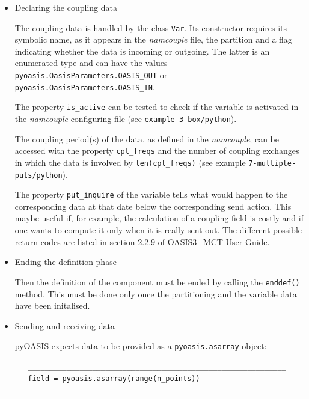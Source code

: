 \begin{itemize}
To initialise  a grid and write the grid longitudes and latitudes, one
has to create an instance of the {\tt Grid} class. Then to write the grid cell corner longitudes and latitudes, areas, mask, cell valid fraction, angle, the
{\tt set\_corners}, {\tt set\_area},  {\tt set\_mask},  {\tt set\_frac}, and {\tt set\_angle} methods can be used respectively.

\item{Declaring the coupling data}
\label{{index:declaring-the-coupling-data}}

The coupling data is handled by the class {\tt Var}. Its constructor requires
its symbolic name, as it appears in the {\it namcouple} file, the partition and a flag indicating whether the
data is incoming or outgoing. The latter is an enumerated type and can
have the values {\tt pyoasis.OasisParameters.OASIS\_OUT} or
{\tt pyoasis.OasisParameters.OASIS\_IN}. 

The property {\tt is\_active} can be tested to check if the variable is
activated in the {\it namcouple} configuring file (see {\tt example 3-box/python}).

The coupling period(s) of the data, as defined in the {\it namcouple}, can be
accessed with the property {\tt cpl\_freqs} and the number of coupling exchanges in
which the data is involved by {\tt len(cpl\_freqs)} (see example {\tt 7-multiple-puts/python}).

The property {\tt put\_inquire} of the variable tells what would happen to the corresponding data at that date
below the corresponding send action. This maybe useful if, for
example, the calculation of a coupling field is costly and if one
wants to compute it only when it is really sent out. The
different possible return codes are listed in section 2.2.9 of
OASIS3\_MCT User Guide.

\item{Ending the definition phase}
\label{{index:ending-the-definition-phase}}

Then the definition of the component must be ended by calling the {\tt enddef()}
method. This must be done only once the partitioning and the variable data have been initalised.

\item{Sending and receiving data}
\label{{index:sending-and-receiving-data}}

pyOASIS expects data to be provided as a {\tt pyoasis.asarray} object:

\begin{verbatim}
   ____________________________________________________________
   field = pyoasis.asarray(range(n_points))
   ____________________________________________________________
\end{verbatim}


\end{itemize}
